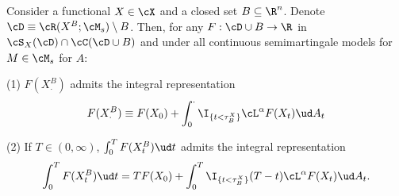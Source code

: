 \documentclass[11pt]{article}
\begin{document}
\begin{proposition}
\label{proposition: integral representation}
Consider a functional $X \in \cX$ and a closed set $B \subseteq \R^n$. Denote $\cD \equiv \cR(X^B;\cM_s) \setminus B$. Then, for any $F: \cD \cup B \to \R$ in $\cS_X(\cD) \cap \cC(\cD \cup B)$ and under all continuous semimartingale models for $M \in \cM_s$ for $A$:
\item (1) $F(X^B_\cdot)$ admits the integral representation
\begin{equation}
\label{integral representation of F}
F(X^B_\cdot) \equiv F(X_0) + \int_0^\cdot \I_{\{t < \tau^X_B\}} \cL^\alpha F(X_t) \ud A_t
\end{equation}

\item (2) If $T \in (0,\infty)$, $\int_0^T F(X^B_t) \ud t$ admits the integral representation
\begin{equation}
\label{integral representation of cash flow}
\int_0^T F(X^B_t) \ud t = T F(X_0) + \int_0^{T} \I_{\{t < \tau^X_B\}} (T-t) \cL^\alpha F(X_t) \ud A_t.
\end{equation}
\end{proposition}
\end{document}
